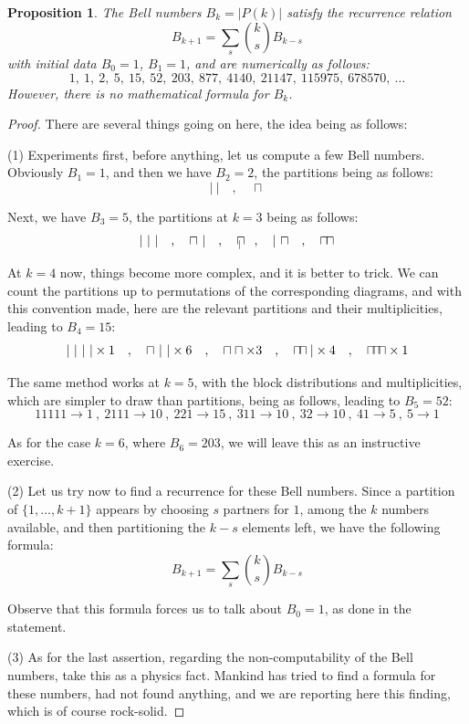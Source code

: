 \documentclass[12pt]{amsbook}
\newtheorem{proposition}[theorem]{Proposition}
\begin{document}

\begin{proposition}
The Bell numbers $B_k=|P(k)|$ satisfy the recurrence relation
$$B_{k+1}=\sum_s\binom{k}{s}B_{k-s}$$
with initial data $B_0=1$, $B_1=1$, and are numerically as follows:
$$1,\ 1,\ 2,\ 5,\ 15,\ 52,\ 203,\ 877,\ 4140,\ 21147,\ 115975,\ 678570,\ \ldots$$
However, there is no mathematical formula for $B_k$.
\end{proposition}

\begin{proof}
There are several things going on here, the idea being as follows:

\medskip

(1) Experiments first, before anything, let us compute a few Bell numbers. Obviously $B_1=1$, and then we have $B_2=2$, the partitions being as follows:
$$|\ |\quad,\quad\sqcap$$

Next, we have $B_3=5$, the partitions at $k=3$ being as follows:
$$|\ |\ |\quad,\quad\sqcap\ |\quad,\quad\sqcap\hskip-3.2mm{\ }_|\quad,\quad|\ \sqcap\quad,\quad\sqcap\hskip-0.7mm\sqcap$$

At $k=4$ now, things become more complex, and it is better to trick. We can count the partitions up to permutations of the corresponding diagrams, and with this convention made, here are the relevant partitions and their multiplicities, leading to $B_4=15$:
$$|\ |\ |\ |\times1\quad,\quad \sqcap\ |\ |\times 6\quad,\quad \sqcap\sqcap\times 3
\quad,\quad \sqcap\hskip-1.6mm\sqcap|\times4\quad,\quad \sqcap\hskip-1.6mm\sqcap\hskip-1.6mm\sqcap\times1$$

The same method works at $k=5$, with the block distributions and multiplicities, which are simpler to draw than partitions, being as follows, leading to $B_5=52$:
$$11111\to1\ ,\ 2111\to10\ ,\ 221\to15\ ,\ 311\to10\ ,\ 32\to10\ ,\ 41\to5\ ,\ 5\to1$$

As for the case $k=6$, where $B_6=203$, we will leave this as an instructive exercise.

\medskip

(2) Let us try now to find a recurrence for these Bell numbers. Since a partition of $\{1,\ldots,k+1\}$ appears by choosing $s$ partners for $1$, among the $k$ numbers available, and then partitioning the $k-s$ elements left, we have the following formula:
$$B_{k+1}=\sum_s\binom{k}{s}B_{k-s}$$

Observe that this formula forces us to talk about $B_0=1$, as done in the statement.

\medskip

(3) As for the last assertion, regarding the non-computability of the Bell numbers, take this as a physics fact. Mankind has tried to find a formula for these numbers, had not found anything, and we are reporting here this finding, which is of course rock-solid.
\end{proof}
\end{document}
